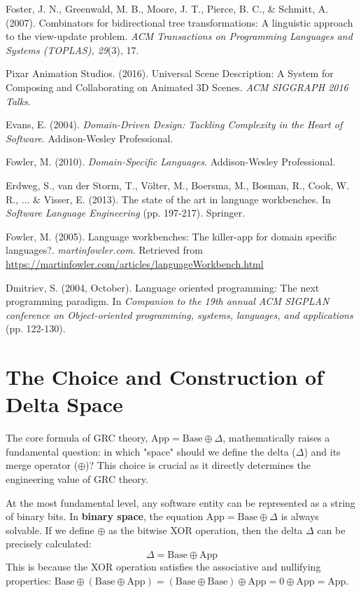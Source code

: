 \documentclass[11pt]{article}
\begin{document}
\begin{thebibliography}{99}
Foster, J. N., Greenwald, M. B., Moore, J. T., Pierce, B. C., \& Schmitt, A. (2007). Combinators for bidirectional tree transformations: A linguistic approach to the view-update problem. \textit{ACM Transactions on Programming Languages and Systems (TOPLAS), 29}(3), 17.

Pixar Animation Studios. (2016). Universal Scene Description: A System for Composing and Collaborating on Animated 3D Scenes. \textit{ACM SIGGRAPH 2016 Talks}.

Evans, E. (2004). \textit{Domain-Driven Design: Tackling Complexity in the Heart of Software}. Addison-Wesley Professional.

Fowler, M. (2010). \textit{Domain-Specific Languages}. Addison-Wesley Professional.

Erdweg, S., van der Storm, T., Völter, M., Boersma, M., Bosman, R., Cook, W. R., ... \& Visser, E. (2013). The state of the art in language workbenches. In \textit{Software Language Engineering} (pp. 197-217). Springer.

Fowler, M. (2005). Language workbenches: The killer-app for domain specific languages?. \textit{martinfowler.com}. Retrieved from \url{https://martinfowler.com/articles/languageWorkbench.html}

Dmitriev, S. (2004, October). Language oriented programming: The next programming paradigm. In \textit{Companion to the 19th annual ACM SIGPLAN conference on Object-oriented programming, systems, languages, and applications} (pp. 122-130).

\end{thebibliography}

\appendix

\section{The Choice and Construction of Delta Space}

The core formula of GRC theory, $\text{App} = \text{Base} \oplus \Delta$, mathematically raises a fundamental question: in which "space" should we define the delta ($\Delta$) and its merge operator ($\oplus$)? This choice is crucial as it directly determines the engineering value of GRC theory.

At the most fundamental level, any software entity can be represented as a string of binary bits. In \textbf{binary space}, the equation $\text{App} = \text{Base} \oplus \Delta$ is always solvable. If we define $\oplus$ as the bitwise XOR operation, then the delta $\Delta$ can be precisely calculated:
\[
\Delta = \text{Base} \oplus \text{App}
\]
This is because the XOR operation satisfies the associative and nullifying properties: $\text{Base} \oplus (\text{Base} \oplus \text{App}) = (\text{Base} \oplus \text{Base}) \oplus \text{App} = 0 \oplus \text{App} = \text{App}$.
\end{document}
